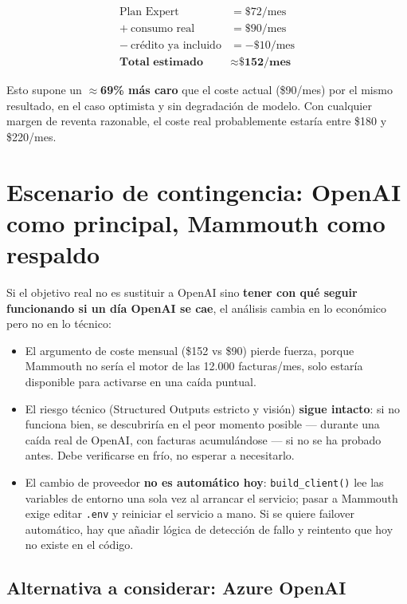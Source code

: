 \documentclass[11pt,a4paper]{article}
\begin{document}
\begin{align*}
\text{Plan Expert} &= \$72/\text{mes} \\
+\ \text{consumo real} &= \$90/\text{mes} \\
-\ \text{crédito ya incluido} &= -\$10/\text{mes} \\
\hline
\textbf{Total estimado} &\approx \textbf{\$152/mes}
\end{align*}

Esto supone un \textbf{$\approx$69\% más caro} que el coste actual (\$90/mes) por
el mismo resultado, en el caso optimista y sin degradación de modelo. Con
cualquier margen de reventa razonable, el coste real probablemente estaría entre
\$180 y \$220/mes.

\section{Escenario de contingencia: OpenAI como principal, Mammouth como respaldo}
\label{sec:contingencia}

Si el objetivo real no es sustituir a OpenAI sino \textbf{tener con qué seguir
funcionando si un día OpenAI se cae}, el análisis cambia en lo económico pero no
en lo técnico:

\begin{itemize}
    \item El argumento de coste mensual (\$152 vs \$90) pierde fuerza, porque
    Mammouth no sería el motor de las 12.000 facturas/mes, solo estaría
    disponible para activarse en una caída puntual.
    \item El riesgo técnico (Structured Outputs estricto y visión) \textbf{sigue
    intacto}: si no funciona bien, se descubriría en el peor momento posible
    --- durante una caída real de OpenAI, con facturas acumulándose --- si no se
    ha probado antes. Debe verificarse en frío, no esperar a necesitarlo.
    \item El cambio de proveedor \textbf{no es automático hoy}: \texttt{build\_client()}
    lee las variables de entorno una sola vez al arrancar el servicio; pasar a
    Mammouth exige editar \texttt{.env} y reiniciar el servicio a mano. Si se
    quiere failover automático, hay que añadir lógica de detección de fallo y
    reintento que hoy no existe en el código.
\end{itemize}

\subsection{Alternativa a considerar: Azure OpenAI}
\end{document}
